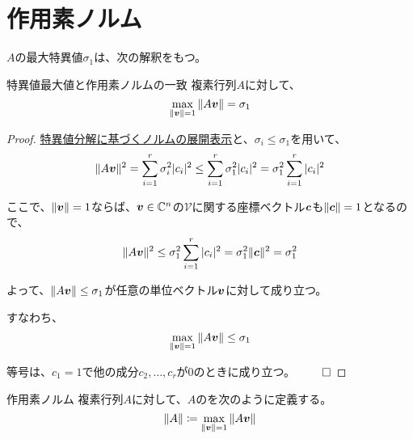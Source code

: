 \documentclass[../../../topic_linear-algebra]{subfiles}
\begin{document}
\sectionline
\section{作用素ノルム}

$A$の最大特異値$\sigma_1$は、次の解釈をもつ。

\begin{theorem}{特異値最大値と作用素ノルムの一致}
  複素行列$A$に対して、
  \begin{equation*}
    \max_{\| \vb*{v} \| = 1}{\| A \vb*{v} \|} = \sigma_1
  \end{equation*}
\end{theorem}

\begin{proof}
  \hyperref[thm:norm-expansion-svd]{特異値分解に基づくノルムの展開表示}と、$\sigma_i \leq \sigma_1$を用いて、
  \begin{equation*}
    \| A \vb*{v} \|^2 = \sum_{i=1}^r \sigma_i^2 |c_i|^2 \leq \sum_{i=1}^r \sigma_1^2 |c_i|^2 = \sigma_1^2 \sum_{i=1}^r |c_i|^2
  \end{equation*}
  
  ここで、$\| \vb*{v} \| = 1$ならば、$\vb*{v} \in \mathbb{C}^n$の$\mathcal{V}$に関する座標ベクトル$\vb*{c}$も$\| \vb*{c} \| = 1$となるので、
  \begin{equation*}
    \| A \vb*{v} \|^2 \leq \sigma_1^2 \sum_{i=1}^r |c_i|^2 = \sigma_1^2 \| \vb*{c} \|^2 = \sigma_1^2
  \end{equation*}
  
  よって、$\| A \vb*{v} \| \leq \sigma_1$が任意の単位ベクトル$\vb*{v}$に対して成り立つ。
  
  すなわち、
  \begin{equation*}
    \max_{\| \vb*{v} \| = 1} \| A \vb*{v} \| \leq \sigma_1
  \end{equation*}
  
  等号は、$c_1 = 1$で他の成分$c_2, \dots, c_r$が0のときに成り立つ。 $\qed$
\end{proof}

\br

\begin{definition}{作用素ノルム}
  複素行列$A$に対して、$A$のを次のように定義する。
  \begin{equation*}
    \| A \| \coloneq \max_{\| \vb*{v} \| = 1} \| A \vb*{v} \|
  \end{equation*}
\end{definition}
\end{document}
